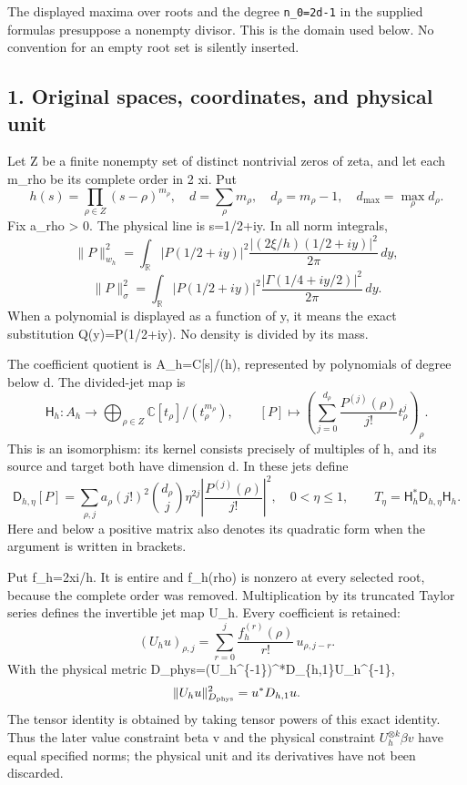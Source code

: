 The displayed maxima over roots and the degree \texttt{n\_0=2d-1} in the supplied formulas presuppose a nonempty divisor. This is the domain used below. No convention for an empty root set is silently inserted.

\subsection{1. Original spaces, coordinates, and physical unit}\label{mrcoerc:original-spaces-coordinates-and-physical-unit}

Let Z be a finite nonempty set of distinct nontrivial zeros of zeta, and let each m\_rho be its complete order in 2 xi. Put \[
h(s)=\prod_{\rho\in Z}(s-\rho)^{m_\rho},\quad
d=\sum_\rho m_\rho,\quad d_\rho=m_\rho-1,\quad
d_{\max}=\max_\rho d_\rho.
\] Fix a\_rho \textgreater{} 0. The physical line is s=1/2+iy. In all norm integrals, \[
\|P\|_{w_h}^2=\int_{\mathbb R}|P(1/2+iy)|^2
 \frac{|(2\xi/h)(1/2+iy)|^2}{2\pi}\,dy,
\] \[
\|P\|_\sigma^2=\int_{\mathbb R}|P(1/2+iy)|^2
 \frac{|\Gamma(1/4+iy/2)|^2}{2\pi}\,dy.
\] When a polynomial is displayed as a function of y, it means the exact substitution Q(y)=P(1/2+iy). No density is divided by its mass.

The coefficient quotient is A\_h=C{[}s{]}/(h), represented by polynomials of degree below d. The divided-jet map is \[
\mathsf H_h:A_h\longrightarrow
 \bigoplus_{\rho\in Z}\mathbb C[t_\rho]/(t_\rho^{m_\rho}),\qquad
[P]\longmapsto\left(\sum_{j=0}^{d_\rho}
 \frac{P^{(j)}(\rho)}{j!}t_\rho^j\right)_\rho.
\] This is an isomorphism: its kernel consists precisely of multiples of h, and its source and target both have dimension d. In these jets define \[
\mathsf D_{h,\eta}[P]=\sum_{\rho,j}
a_\rho(j!)^2\binom{d_\rho}{j}\eta^{2j}
\left|\frac{P^{(j)}(\rho)}{j!}\right|^2,
\quad 0<\eta\le1,
\qquad T_\eta=\mathsf H_h^*\mathsf D_{h,\eta}\mathsf H_h.
\] Here and below a positive matrix also denotes its quadratic form when the argument is written in brackets.

Put f\_h=2xi/h. It is entire and f\_h(rho) is nonzero at every selected root, because the complete order was removed. Multiplication by its truncated Taylor series defines the invertible jet map U\_h. Every coefficient is retained: \[
(U_h u)_{\rho,j}=\sum_{r=0}^j
 \frac{f_h^{(r)}(\rho)}{r!}\,u_{\rho,j-r}.
\] With the physical metric D\_phys=(U\_h\^{}\{-1\})\^{}*D\_\{h,1\}U\_h\^{}\{-1\}, \[
\|U_hu\|_{D_{\rm phys}}^2=u^*D_{h,1}u.
\] The tensor identity is obtained by taking tensor powers of this exact identity. Thus the later value constraint beta v and the physical constraint \(U_h^{\otimes k}\beta v\) have equal specified norms; the physical unit and its derivatives have not been discarded.

